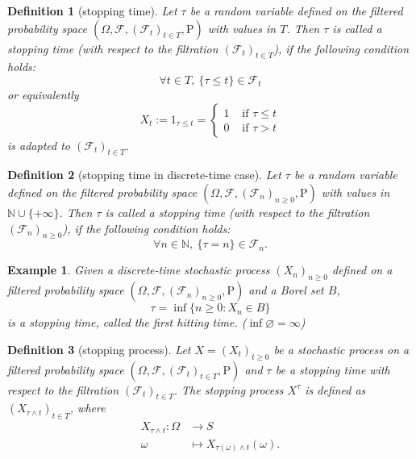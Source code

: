 \documentclass{article}
\newtheorem{definition}{Definition}[section]
\newtheorem{example}{Example}[section]
\theoremstyle{nonumberplain}
\begin{document}
\begin{definition}[stopping time]
Let $\tau$  be a random variable defined on the filtered probability space $(\Omega,\mathcal{F},(\mathcal{F}_{t})_{t\in T },\mathrm{P})$ with values in $T$. Then $\tau$  is called a \emph{stopping time} (with respect to the filtration $(\mathcal{F}_{t})_{t\in T}$), if the following condition holds:
\[
\forall t\in T,\ \{\tau \leq t\}\in {\mathcal {F}}_{t}
\]
or equivalently
\[
X_{t} :=1_{\tau\le t}=\left\{\begin{array}{ll}{1} & {\text { if }  \tau\le t } \\ {0} & {\text { if }\tau >t}\end{array}\right.
\]
is adapted to $(\mathcal{F}_{t})_{t\in T }$.
\end{definition}

\begin{definition}[stopping time in discrete-time case]
	Let $\tau$  be a random variable defined on the filtered probability space $(\Omega,\mathcal{F},(\mathcal{F}_{n})_{n\ge0},\mathrm{P})$ with values in $\mathbb{N}\cup\{+\infty\}$. Then $\tau$  is called a stopping time (with respect to the filtration $(\mathcal{F}_{n})_{n\ge 0}$), if the following condition holds:
	\[
	\forall n\in\mathbb{N},\ \{\tau =n\}\in {\mathcal {F}}_{n}.
	\]
\end{definition}
\begin{example}
	Given a discrete-time stochastic process $(X_{n})_{n\ge 0}$ defined on a filtered probability space $(\Omega,\mathcal{F},(\mathcal{F}_{n})_{n\ge0 },\mathrm{P})$ and a Borel set $B$,
	\[
	\tau=\inf\{n\ge0:X_n\in B\}
	\]
	is a stopping time, called the \emph{first hitting time}. ($\inf\varnothing = \infty $)
\end{example}

\begin{definition}[stopping process]
	Let $X=(X_{t})_{t\ge 0}$ be a stochastic process on a filtered probability space $(\Omega,\mathcal{F},(\mathcal{F}_{t})_{t\in T},\mathrm{P})$ and $\tau$ be a stopping time with respect to the filtration $(\mathcal{F}_{t})_{t\in T}$. The stopping process $X^\tau$ is defined as $(X_{\tau \wedge t})_{t\in T}$, where
	\begin{align*}
	X_{\tau \wedge t}:\Omega&\longrightarrow S\\
	\omega&\longmapsto X_{\tau(\omega) \wedge t}(\omega).
	\end{align*}
\end{definition}
\end{document}
